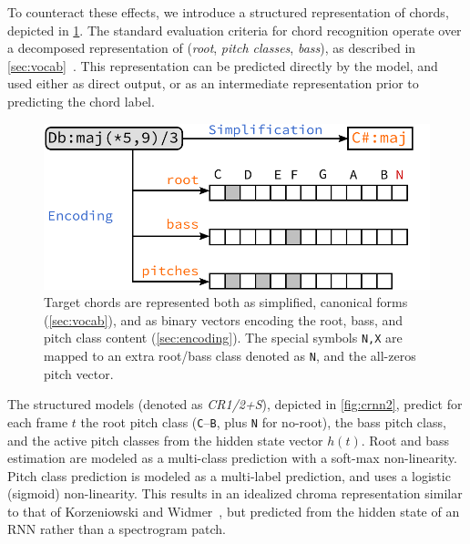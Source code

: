 \documentclass{article}
\begin{document}

To counteract these effects, we introduce a structured representation of chords, depicted in \cref{fig:encoding}.
The standard evaluation criteria for chord recognition operate over a decomposed representation of (\emph{root}, \emph{pitch classes}, \emph{bass}), as described in \cref{sec:vocab}~\cite{raffel2014mir_eval}.
This representation can be predicted directly by the model, and used either as direct output, or as an intermediate representation prior to predicting the chord label.


\begin{figure}
    \centering
    \includegraphics[width=0.9\columnwidth]{encoding}
    \caption{Target chords are represented both as simplified, canonical forms (\cref{sec:vocab}), and as binary vectors encoding the root, bass, and pitch class content (\cref{sec:encoding}).
    The special symbols \texttt{N,X} are mapped to an extra root/bass class denoted as \texttt{N}, and the all-zeros pitch vector.\label{fig:encoding}}
\end{figure}

The structured models (denoted as \emph{CR1/2+S}), depicted in \cref{fig:crnn2}, predict for each frame $t$ the root pitch class (\texttt{C}--\texttt{B}, plus \texttt{N} for no-root), the bass pitch class, and the active pitch classes from the hidden state vector $h(t)$.
Root and bass estimation are modeled as a multi-class prediction with a soft-max non-linearity.
Pitch class prediction is modeled as a multi-label prediction, and uses a logistic (sigmoid) non-linearity.
This results in an idealized chroma representation similar to that of Korzeniowski and Widmer~\cite{korzeniowski2016feature}, but predicted from the hidden state of an RNN rather than a spectrogram patch.
\end{document}
